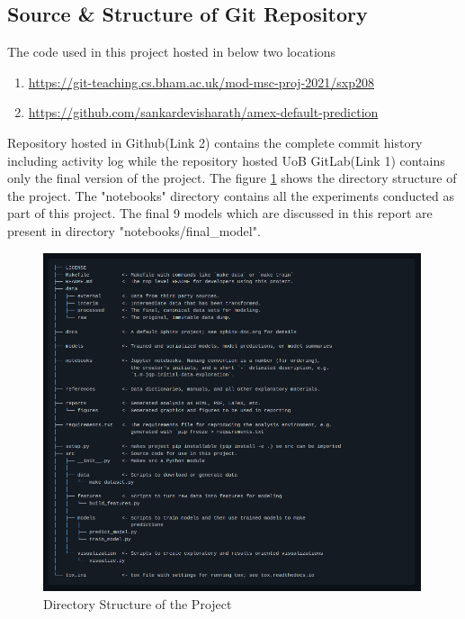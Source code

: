 \documentclass[twoside,11pt,a4paper]{article}
\begin{document}
\subsection{Source \& Structure of Git Repository}
The code used in this project hosted in below two locations
\begin{enumerate}
	\item \url{https://git-teaching.cs.bham.ac.uk/mod-msc-proj-2021/sxp208}
	\item \url{https://github.com/sankardevisharath/amex-default-prediction}
\end{enumerate}
Repository hosted in Github(Link 2) contains the complete commit history including activity log while the repository hosted UoB GitLab(Link 1) contains only the final version of the project.
The figure \ref{fig:directory_structure} shows the directory structure of the project. The "notebooks" directory contains all the experiments conducted as part of this project. The final 9 models which are discussed in this report are present in directory "notebooks/final\_model".\\

\begin{figure}[ht]
	\centering
	\includegraphics[width=0.99\textwidth, height=0.7\textheight]{directory_structure}
	\caption[Directory Structure of the Project]{Directory Structure of the Project}
	\label{fig:directory_structure}
\end{figure} 
\FloatBarrier
\end{document}
